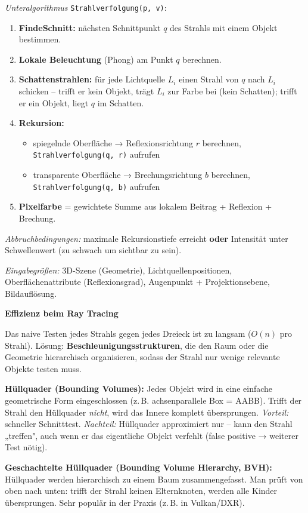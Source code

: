 \documentclass[12pt, a4paper]{article}
\begin{document}
\textit{Unteralgorithmus} \texttt{Strahlverfolgung(p, v)}:
\begin{enumerate}
  \item \textbf{FindeSchnitt:} nächsten Schnittpunkt $q$ des Strahls mit einem Objekt bestimmen.
  \item \textbf{Lokale Beleuchtung} (Phong) am Punkt $q$ berechnen.
  \item \textbf{Schattenstrahlen:} für jede Lichtquelle $L_i$ einen Strahl von $q$ nach $L_i$ schicken -- trifft er kein Objekt, trägt $L_i$ zur Farbe bei (kein Schatten); trifft er ein Objekt, liegt $q$ im Schatten.
  \item \textbf{Rekursion:}
  \begin{itemize}
    \item spiegelnde Oberfläche → Reflexionsrichtung $r$ berechnen, \texttt{Strahlverfolgung(q, r)} aufrufen
    \item transparente Oberfläche → Brechungsrichtung $b$ berechnen, \texttt{Strahlverfolgung(q, b)} aufrufen
  \end{itemize}
  \item \textbf{Pixelfarbe} = gewichtete Summe aus lokalem Beitrag + Reflexion + Brechung.
\end{enumerate}

\textit{Abbruchbedingungen:} maximale Rekursionstiefe erreicht \textbf{oder} Intensität unter Schwellenwert (zu schwach um sichtbar zu sein).

\textit{Eingabegrößen:} 3D-Szene (Geometrie), Lichtquellenpositionen, Oberflächenattribute (Reflexionsgrad), Augenpunkt + Projektionsebene, Bildauflösung.

\medskip
\textbf{Effizienz beim Ray Tracing}

Das naive Testen jedes Strahls gegen jedes Dreieck ist zu langsam ($O(n)$ pro Strahl). Lösung: \textbf{Beschleunigungsstrukturen}, die den Raum oder die Geometrie hierarchisch organisieren, sodass der Strahl nur wenige relevante Objekte testen muss.

\textbf{Hüllquader (Bounding Volumes):} Jedes Objekt wird in eine einfache geometrische Form eingeschlossen (z.\,B. achsenparallele Box = AABB). Trifft der Strahl den Hüllquader \textit{nicht}, wird das Innere komplett übersprungen. \textit{Vorteil:} schneller Schnitttest. \textit{Nachteil:} Hüllquader approximiert nur -- kann den Strahl „treffen", auch wenn er das eigentliche Objekt verfehlt (false positive → weiterer Test nötig).

\textbf{Geschachtelte Hüllquader (Bounding Volume Hierarchy, BVH):} Hüllquader werden hierarchisch zu einem Baum zusammengefasst. Man prüft von oben nach unten: trifft der Strahl keinen Elternknoten, werden alle Kinder übersprungen. Sehr populär in der Praxis (z.\,B. in Vulkan/DXR).
\end{document}
